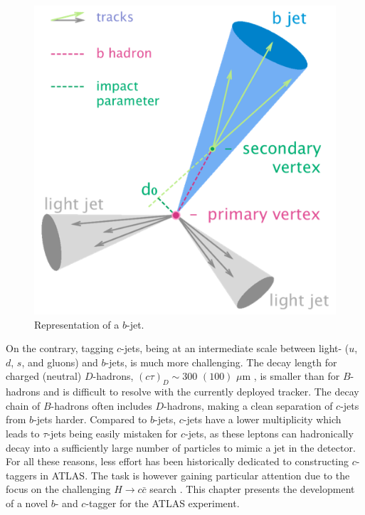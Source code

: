 \begin{figure}[h!]
\center
\includegraphics[scale=0.6]{Images/bjet}
\caption{Representation of a $b$-jet.} 
\label{fig:bjet}
\end{figure}

On the contrary, tagging $c$-jets, being at an intermediate scale between light- ($u$, $d$, $s$, and gluons) and $b$-jets, is much more challenging. The decay length for charged (neutral) $D$-hadrons, $(c\tau)_D \sim 300$ $(100)$ $\mu$m \cite{Tanabashi:2018oca}, is smaller than for $B$-hadrons and is difficult to resolve with the currently deployed tracker. The decay chain of $B$-hadrons often includes $D$-hadrons, making a clean separation of $c$-jets from $b$-jets harder. Compared to $b$-jets, $c$-jets have a lower multiplicity which leads to $\tau$-jets being easily mistaken for $c$-jets, as these leptons can hadronically decay into a sufficiently large number of particles to mimic a jet in the detector. For all these reasons, less effort has been historically dedicated to constructing $c$-taggers in ATLAS. The task is however gaining particular attention due to the focus on the challenging $H \rightarrow c\bar{c}$ search \cite{Aaboud:2018fhh}. This chapter presents the development of a novel $b$- and $c$-tagger for the ATLAS experiment. \\

